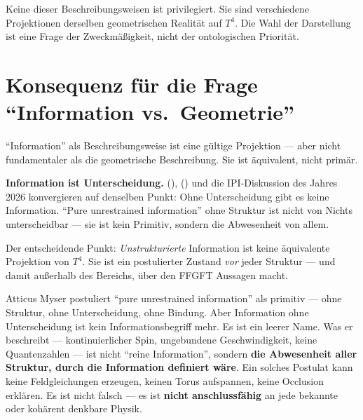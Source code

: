 Keine dieser Beschreibungsweisen ist privilegiert. Sie sind verschiedene Projektionen derselben geometrischen Realität auf $T^4$. Die Wahl der Darstellung ist eine Frage der Zweckmäßigkeit, nicht der ontologischen Priorität.

\section{Konsequenz für die Frage ``Information vs.\ Geometrie''}

``Information'' als Beschreibungsweise ist eine gültige Projektion --- aber nicht fundamentaler als die geometrische Beschreibung. Sie ist äquivalent, nicht primär.

\begin{keyresult}
\textbf{Information ist Unterscheidung.} \citeauthor{Shannon1948} (\citeyear{Shannon1948}), \citeauthor{Bateson1972} (\citeyear{Bateson1972}) und die IPI-Diskussion des Jahres 2026 \cite{Kriger2026} konvergieren auf denselben Punkt: Ohne Unterscheidung gibt es keine Information. ``Pure unrestrained information'' ohne Struktur ist nicht von Nichts unterscheidbar --- sie ist kein Primitiv, sondern die Abwesenheit von allem.
\end{keyresult}

Der entscheidende Punkt: \emph{Unstrukturierte} Information ist keine äquivalente Projektion von $T^4$. Sie ist ein postulierter Zustand \emph{vor} jeder Struktur --- und damit außerhalb des Bereichs, über den FFGFT Aussagen macht.

\begin{erkenntnis}
Atticus Myser postuliert ``pure unrestrained information'' als primitiv --- ohne Struktur, ohne Unterscheidung, ohne Bindung. Aber Information ohne Unterscheidung ist kein Informationsbegriff mehr. Es ist ein leerer Name. Was er beschreibt --- kontinuierlicher Spin, ungebundene Geschwindigkeit, keine Quantenzahlen --- ist nicht ``reine Information'', sondern \textbf{die Abwesenheit aller Struktur, durch die Information definiert wäre}. Ein solches Postulat kann keine Feldgleichungen erzeugen, keinen Torus aufspannen, keine Occlusion erklären. Es ist nicht falsch --- es ist \textbf{nicht anschlussfähig} an jede bekannte oder kohärent denkbare Physik.
\end{erkenntnis}

